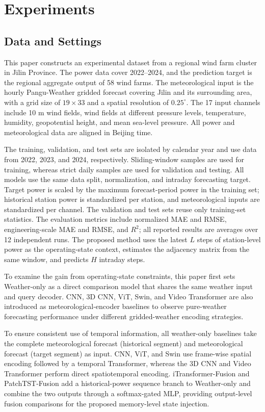 \section{Experiments}

\subsection{Data and Settings}

This paper constructs an experimental dataset from a regional wind farm cluster in Jilin Province. The power data cover 2022--2024, and the prediction target is the regional aggregate output of 58 wind farms. The meteorological input is the hourly Pangu-Weather gridded forecast covering Jilin and its surrounding area, with a grid size of \(19\times33\) and a spatial resolution of \(0.25^\circ\). The 17 input channels include 10 m wind fields, wind fields at different pressure levels, temperature, humidity, geopotential height, and mean sea-level pressure. All power and meteorological data are aligned in Beijing time.

The training, validation, and test sets are isolated by calendar year and use data from 2022, 2023, and 2024, respectively. Sliding-window samples are used for training, whereas strict daily samples are used for validation and testing. All models use the same data split, normalization, and intraday forecasting target. Target power is scaled by the maximum forecast-period power in the training set; historical station power is standardized per station, and meteorological inputs are standardized per channel. The validation and test sets reuse only training-set statistics. The evaluation metrics include normalized MAE and RMSE, engineering-scale MAE and RMSE, and \(R^2\); all reported results are averages over 12 independent runs. The proposed method uses the latest \(L\) steps of station-level power as the operating-state context, estimates the adjacency matrix from the same window, and predicts \(H\) intraday steps.

To examine the gain from operating-state constraints, this paper first sets Weather-only as a direct comparison model that shares the same weather input and query decoder. CNN, 3D CNN, ViT, Swin, and Video Transformer are also introduced as meteorological-encoder baselines to observe pure-weather forecasting performance under different gridded-weather encoding strategies.

To ensure consistent use of temporal information, all weather-only baselines take the complete meteorological forecast (historical segment) and meteorological forecast (target segment) as input. CNN, ViT, and Swin use frame-wise spatial encoding followed by a temporal Transformer, whereas the 3D CNN and Video Transformer perform direct spatiotemporal encoding. iTransformer-Fusion and PatchTST-Fusion add a historical-power sequence branch to Weather-only and combine the two outputs through a softmax-gated MLP, providing output-level fusion comparisons for the proposed memory-level state injection.

